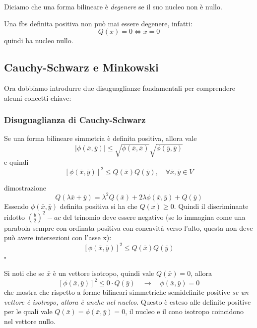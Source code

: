\documentclass[x11names]{article}
\newcommand*{\QEDB}{\null\nobreak\hfill\ensuremath{\square}}%
\begin{document}
\noindent
Diciamo che una forma bilineare è \textit{degenere} se il suo nucleo non è nullo.

Una fbs definita positiva non può mai essere degenere, infatti:
\[
Q(\bar{x}) = 0 \Longleftrightarrow \bar{x} = 0
\]
quindi ha nucleo nullo.

\subsection{Cauchy-Schwarz e Minkowski}
Ora dobbiamo introdurre due disuguaglianze fondamentali per comprendere alcuni concetti chiave:

\begin{center}
	\colorbox{myred}{\begin{minipage}{5.75in}
			\begin{redes}{}
				\subsubsection{Disuguaglianza di Cauchy-Schwarz}
				Se una forma bilineare simmetria è definita positiva, allora vale
				\[
				| \phi(\bar{x},\bar{y}) | \leq \sqrt{\phi(\bar{x},\bar{x})} \sqrt{\phi(\bar{y},\bar{y})}
				\] 
				e quindi
				\[
				\left[\phi(\bar{x},\bar{y})\right]^2\leq Q(\bar{x})Q(\bar{y}), \quad \forall \bar{x},\bar{y} \in V
				\]
			\end{redes}
	\end{minipage}}        
\end{center}
\begin{es}{dimostrazione}
	\[
	Q(\lambda \bar{x}+\bar{y}) = \lambda^2Q(\bar{x}) + 2\lambda\phi(\bar{x},\bar{y}) + Q(\bar{y})
	\]
	Essendo $\phi(\bar{x},\bar{y})$ definita positiva si ha che $Q(x) \geq 0$. Quindi il discriminante ridotto $\left(\frac{b}{2}\right)^2 -ac$ del trinomio deve essere negativo (se lo immagina come una parabola sempre con ordinata positiva con concavità verso l'alto, questa non deve può avere intersezioni con l'asse x):
	\[
	\left[\phi(\bar{x},\bar{y})\right]^2\leq Q(\bar{x})Q(\bar{y})
	\] \QEDB
\end{es}
Si noti che se $\bar{x}$ è un vettore isotropo, quindi vale $Q(\bar{x}) = 0$, allora
\[
\left[\phi(\bar{x},\bar{y})\right]^2\leq 0\cdot Q(\bar{y}) \quad \to \quad \phi(\bar{x},\bar{y}) = 0
\]
che mostra che rispetto a forme bilineari simmetriche semidefinite positive \textit{se un vettore è isotropo, allora è anche nel nucleo}. Questo è esteso alle definite positive per le quali vale $Q(\bar{x}) = \phi(\bar{x},\bar{y}) = 0$, il nucleo e il cono isotropo coincidono nel vettore nullo. \\
\end{document}
